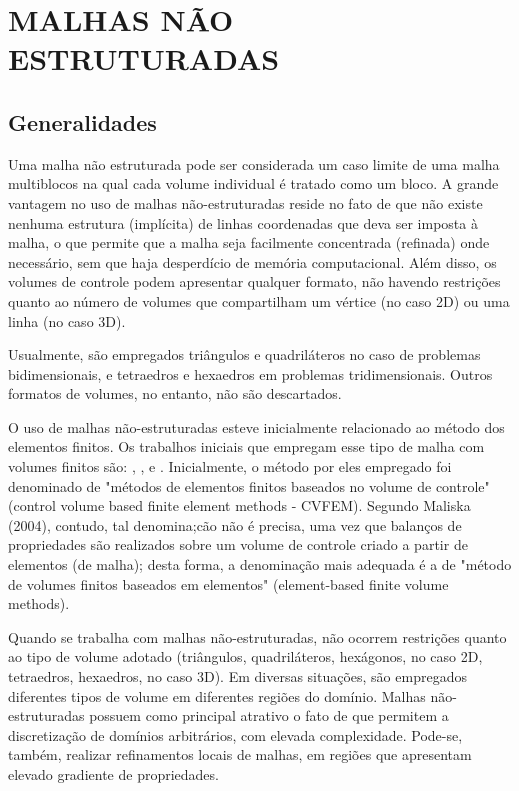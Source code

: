 \chapter[MALHAS NÃO ESTRUTURADAS]{MALHAS NÃO ESTRUTURADAS}

\section{Generalidades}

Uma malha não estruturada pode ser considerada um caso limite de uma malha multiblocos na qual cada volume individual é tratado como um bloco. A grande vantagem no uso de malhas não-estruturadas reside no fato de que não existe nenhuma estrutura (implícita) de linhas coordenadas que deva ser imposta à malha, o que permite que a malha seja facilmente concentrada (refinada) onde necessário, sem que haja desperdício de memória computacional. Além disso, os volumes de controle podem apresentar qualquer formato, não havendo restrições quanto ao número de volumes que compartilham um vértice (no caso 2D) ou uma linha (no caso 3D).

Usualmente, são empregados triângulos e quadriláteros no caso de problemas bidimensionais, e tetraedros e hexaedros em problemas tridimensionais. Outros formatos de volumes, no entanto, não são descartados.

O uso de malhas não-estruturadas esteve inicialmente relacionado ao método dos elementos finitos. Os trabalhos iniciais que empregam esse tipo de malha com volumes finitos são: \cite{winslow1966numerical}, \cite{baliga1980new}, \cite{baliga1983solution} e \cite{eiser1985trying}. Inicialmente, o método por eles empregado foi denominado de "métodos de elementos finitos baseados no volume de controle"(control volume based finite element methods - CVFEM). Segundo Maliska (2004), contudo, tal denomina;cão não é precisa, uma vez que balanços de propriedades são realizados sobre um volume de controle criado a partir de elementos (de malha); desta forma, a denominação mais adequada é a de "método de volumes finitos baseados em elementos" (element-based finite volume methods).

Quando se trabalha com malhas não-estruturadas, não ocorrem restrições quanto ao tipo de volume adotado (triângulos, quadriláteros, hexágonos, no caso 2D, tetraedros, hexaedros, no caso 3D). Em diversas situações, são empregados diferentes tipos de volume em diferentes regiões do domínio. Malhas não-estruturadas possuem como principal atrativo o fato de que permitem a discretização de domínios arbitrários, com elevada complexidade. Pode-se, também, realizar refinamentos locais de malhas, em regiões que apresentam elevado gradiente de propriedades.

